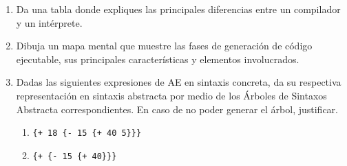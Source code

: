 \documentclass[letterpaper,11pt]{article}
\begin{document}
\begin{enumerate}
    \item Da una tabla donde expliques las principales diferencias entre un 
    compilador y un intérprete.

    \item Dibuja un mapa mental que muestre las fases de generación de código
    ejecutable, sus principales características y elementos involucrados.

    \item Dadas las siguientes expresiones de AE en sintaxis concreta, da su 
    respectiva representación en sintaxis abstracta por medio de los Árboles 
    de Sintaxos Abstracta correspondientes. En caso de no poder generar el
    árbol, justificar. 
    \begin{enumerate}
        \item \texttt{\{+ 18 \{- 15 \{+ 40 5\}\}\}}
        \item \texttt{\{+ \{- 15 \{+ 40\}\}\}}
    \end{enumerate}
\end{enumerate}
\end{document}
